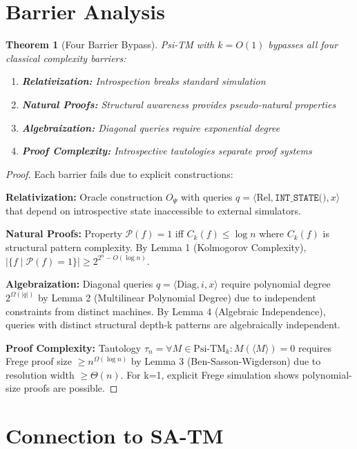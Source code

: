 \documentclass[11pt]{article}
\newtheorem{theorem}{Theorem}
\begin{document}
\section{Barrier Analysis}

\begin{theorem}[Four Barrier Bypass]
Psi-TM with $k = O(1)$ bypasses all four classical complexity barriers:
\begin{enumerate}
\item \textbf{Relativization:} Introspection breaks standard simulation
\item \textbf{Natural Proofs:} Structural awareness provides pseudo-natural properties
\item \textbf{Algebraization:} Diagonal queries require exponential degree
\item \textbf{Proof Complexity:} Introspective tautologies separate proof systems
\end{enumerate}
\end{theorem}

\begin{proof}
Each barrier fails due to explicit constructions:

\textbf{Relativization:} Oracle construction $O_\Psi$ with queries $q = \langle \text{Rel}, \texttt{INT\_STATE()}, x \rangle$ that depend on introspective state inaccessible to external simulators.

\textbf{Natural Proofs:} Property $\mathcal{P}(f) = 1$ iff $C_k(f) \leq \log n$ where $C_k(f)$ is structural pattern complexity. By Lemma 1 (Kolmogorov Complexity), $|\{f \mid \mathcal{P}(f) = 1\}| \geq 2^{2^n - O(\log n)}$.

\textbf{Algebraization:} Diagonal queries $q = \langle \text{Diag}, i, x \rangle$ require polynomial degree $2^{\Omega(|q|)}$ by Lemma 2 (Multilinear Polynomial Degree) due to independent constraints from distinct machines. By Lemma 4 (Algebraic Independence), queries with distinct structural depth-k patterns are algebraically independent.

\textbf{Proof Complexity:} Tautology $\tau_n = \forall M \in \text{Psi-TM}_k: M(\langle M \rangle) = 0$ requires Frege proof size $\geq n^{\Omega(\log n)}$ by Lemma 3 (Ben-Sasson-Wigderson) due to resolution width $\geq \Theta(n)$. For k=1, explicit Frege simulation shows polynomial-size proofs are possible.
\end{proof}

\section{Connection to SA-TM}
\end{document}
